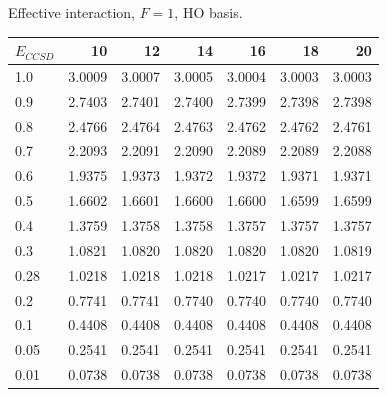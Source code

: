 \begin{table}
\begin{center}
Effective interaction, $F=1$, HO basis.\\
\begin{tabular}{l|rrrrrr}
\hline 
$E_{CCSD}$ & 10 & 12 & 14 & 16 & 18 & 20 \\
\hline \hline
1.0 & 3.0009 & 3.0007 & 3.0005 & 3.0004 & 3.0003 & 3.0003  \\ 
0.9 & 2.7403 & 2.7401 & 2.7400 & 2.7399 & 2.7398 & 2.7398  \\ 
0.8 & 2.4766 & 2.4764 & 2.4763 & 2.4762 & 2.4762 & 2.4761  \\ 
0.7 & 2.2093 & 2.2091 & 2.2090 & 2.2089 & 2.2089 & 2.2088  \\ 
0.6 & 1.9375 & 1.9373 & 1.9372 & 1.9372 & 1.9371 & 1.9371  \\ 
0.5 & 1.6602 & 1.6601 & 1.6600 & 1.6600 & 1.6599 & 1.6599  \\ 
0.4 & 1.3759 & 1.3758 & 1.3758 & 1.3757 & 1.3757 & 1.3757  \\ 
0.3 & 1.0821 & 1.0820 & 1.0820 & 1.0820 & 1.0820 & 1.0819  \\ 
0.28 & 1.0218 & 1.0218 & 1.0218 & 1.0217 & 1.0217 & 1.0217  \\ 
0.2 & 0.7741 & 0.7741 & 0.7740 & 0.7740 & 0.7740 & 0.7740  \\ 
0.1 & 0.4408 & 0.4408 & 0.4408 & 0.4408 & 0.4408 & 0.4408  \\ 
0.05 & 0.2541 & 0.2541 & 0.2541 & 0.2541 & 0.2541 & 0.2541  \\ 
0.01 & 0.0738 & 0.0738 & 0.0738 & 0.0738 & 0.0738 & 0.0738  \\ 
\hline \hline
\end{tabular}
\end{center}
\end{table}

